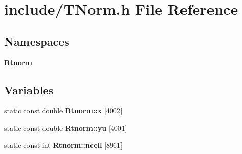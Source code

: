 \section{include/\+T\+Norm.h File Reference}
\label{_t_norm_8h}
\subsection*{Namespaces}
\begin{DoxyCompactItemize}
\item 
 \textbf{ Rtnorm}
\end{DoxyCompactItemize}
\subsection*{Variables}
\begin{DoxyCompactItemize}
\item 
static const double \textbf{ Rtnorm\+::x} [4002]
\item 
static const double \textbf{ Rtnorm\+::yu} [4001]
\item 
static const int \textbf{ Rtnorm\+::ncell} [8961]
\end{DoxyCompactItemize}
